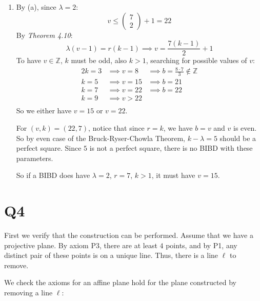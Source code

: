 \documentclass[a4paper, 11pt]{article}
\newcommand{\ZZ}{\mathbb{Z}}
\begin{document}
\begin{enumerate}[label=(\alph*)]



	\item By (a), since $\lambda=2$:
	\[
		v\leq \begin{pmatrix}
		7\\2
	\end{pmatrix}+1=22
	\]
	By \textit{Theorem 4.10}:
	\[
		\lambda(v-1)=r(k-1) \implies v=\frac{7(k-1)}{2}+1
	\]
	To have $v\in\ZZ$, $k$ must be odd, also $k>1$, searching for possible values of $v$: 
	\begin{alignat*}{2}
		k=3 & \implies v=8  & \implies b=\frac{8\cdot 7}{3} \notin\ZZ	\\
		k=5 & \implies v=15 & \implies b=21	\\
		k=7 & \implies v=22 & \implies b=22\\
		k=9 & \implies v>22  	\\
	\end{alignat*}
	So we either have $v=15$ or $v=22$. 
	
	For $(v,k)=(22,7)$, notice that since $r=k$, we have $b=v$ and $v$ is even. So by even case of the Bruck-Ryser-Chowla Theorem, $k-\lambda=5$ should be a perfect square. Since $5$ is not a perfect square, there is no BIBD with these parameters.

	So if a BIBD does have $\lambda=2$, $r=7$, $k>1$, it must have $v=15$. 
\end{enumerate}

\pagebreak
\section*{Q4}
First we verify that the construction can be performed. Assume that we have a projective plane. By axiom P3, there are at least $4$ points, and by P1, any distinct pair of these points is on a unique line. Thus, there is a line $\ell$ to remove. 

We check the axioms for an affine plane hold for the plane constructed by removing a line $\ell$: 
\end{document}
